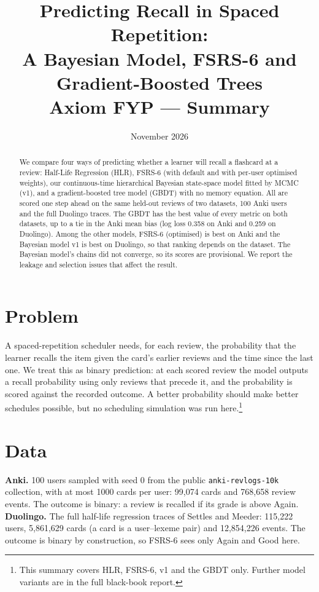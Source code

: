 \documentclass[11pt,a4paper]{article}
\title{\textbf{Predicting Recall in Spaced Repetition:\\A Bayesian Model, FSRS-6 and Gradient-Boosted Trees}\\[4pt]
\large Axiom FYP --- Summary}
\author{}
\date{November 2026}
\begin{document}
\maketitle

\begin{abstract}
\noindent We compare four ways of predicting whether a learner will recall a flashcard at a review: Half-Life Regression (HLR), FSRS-6
(with default and with per-user optimised weights), our continuous-time hierarchical Bayesian state-space model fitted by MCMC (v1), and a
gradient-boosted tree model (GBDT) with no memory equation. All are scored one step ahead on the same held-out reviews of two datasets, 100
Anki users and the full Duolingo traces. The GBDT has the best value of every metric on both datasets, up to a tie in the Anki mean bias (log loss 0.358 on Anki and 0.259 on
Duolingo). Among the other models, FSRS-6 (optimised) is best on Anki and the Bayesian model v1 is best on Duolingo, so that ranking depends on
the dataset. The Bayesian model's chains did not converge, so its scores are provisional. We report the leakage and selection issues that
affect the result.
\end{abstract}

\section{Problem}
A spaced-repetition scheduler needs, for each review, the probability that the learner recalls the item given the card's earlier reviews and
the time since the last one. We treat this as binary prediction: at each scored review the model outputs a recall probability using only
reviews that precede it, and the probability is scored against the recorded outcome. A better probability should make better schedules possible,
but no scheduling simulation was run here.\footnote{This summary covers HLR, FSRS-6, v1 and the GBDT only. Further model variants are in the full black-book report.}

\section{Data}
\textbf{Anki.} 100 users sampled with seed 0 from the public \texttt{anki-revlogs-10k} collection, with at most 1000 cards per user: 99,074 cards and
768,658 review events. The outcome is binary: a review is recalled if its grade is above Again.\\
\textbf{Duolingo.} The full half-life regression traces of Settles and Meeder: 115,222 users, 5,861,629 cards (a card is a user--lexeme pair) and
12,854,226 events. The outcome is binary by construction, so FSRS-6 sees only Again and Good here.
\end{document}

